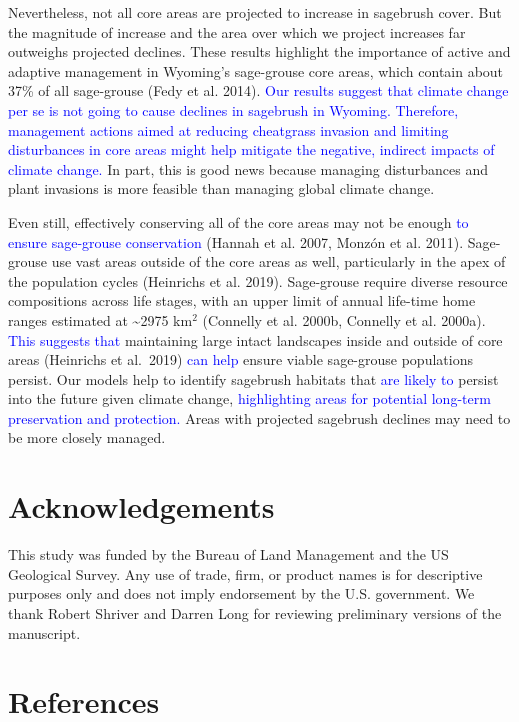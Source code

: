 \documentclass[
  12pt,
]{article}
\begin{document}
Nevertheless, not all core areas are projected to increase in sagebrush cover.
But the magnitude of increase and the area over which we project increases far outweighs projected declines.
These results highlight the importance of active and adaptive management in Wyoming's sage-grouse core areas, which contain about 37\% of all sage-grouse (Fedy et al. 2014).
\textcolor{blue}{Our results suggest that climate change per se is not going to cause declines in sagebrush in Wyoming.}
\textcolor{blue}{Therefore, management actions aimed at reducing cheatgrass invasion and limiting disturbances in core areas might help mitigate the negative, indirect impacts of climate change.}
In part, this is good news because managing disturbances and plant invasions is more feasible than managing global climate change.

Even still, effectively conserving all of the core areas may not be enough \textcolor{blue}{to ensure sage-grouse conservation} (Hannah et al. 2007, Monzón et al. 2011).
Sage-grouse use vast areas outside of the core areas as well, particularly in the apex of the population cycles (Heinrichs et al. 2019).
Sage-grouse require diverse resource compositions across life stages, with an upper limit of annual life-time home ranges estimated at \textasciitilde2975 km\(^2\) (Connelly et al. 2000b, Connelly et al. 2000a).
\textcolor{blue}{This suggests that} maintaining large intact landscapes inside and outside of core areas (Heinrichs et al.~2019) \textcolor{blue}{can help} ensure viable sage-grouse populations persist.
Our models help to identify sagebrush habitats that \textcolor{blue}{are likely to} persist into the future given climate change, \textcolor{blue}{highlighting areas for potential long-term preservation and protection.}
Areas with projected sagebrush declines may need to be more closely managed.

\hypertarget{acknowledgements}{%
\section{Acknowledgements}\label{acknowledgements}}

This study was funded by the Bureau of Land Management and the US Geological Survey.
Any use of trade, firm, or product names is for descriptive purposes only and does not imply endorsement by the U.S. government.
We thank Robert Shriver and Darren Long for reviewing preliminary versions of the manuscript.

\hypertarget{references}{%
\section{References}\label{references}}
\end{document}
